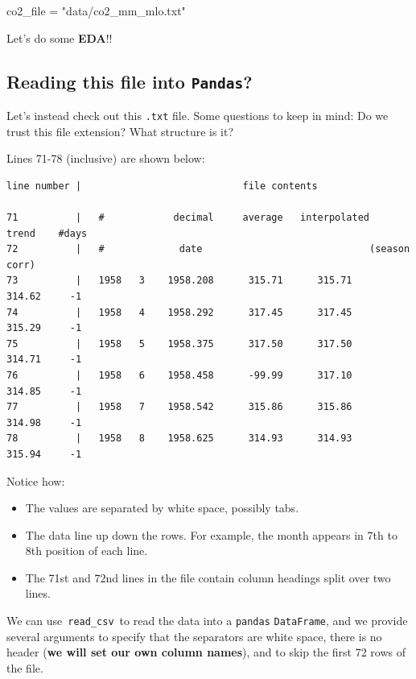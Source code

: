 \documentclass[
  letterpaper,
  DIV=11,
  numbers=noendperiod]{scrreprt}
\newenvironment{Shaded}{\begin{snugshade}}{\end{snugshade}}
\newcommand{\NormalTok}[1]{\textcolor[rgb]{0.00,0.23,0.31}{#1}}
\newcommand{\OperatorTok}[1]{\textcolor[rgb]{0.37,0.37,0.37}{#1}}
\newcommand{\StringTok}[1]{\textcolor[rgb]{0.13,0.47,0.30}{#1}}
\providecommand{\tightlist}{%
  \setlength{\itemsep}{0pt}\setlength{\parskip}{0pt}}\usepackage{longtable,booktabs,array}
\begin{document}
\begin{Shaded}
\begin{Highlighting}[]
\NormalTok{co2\_file }\OperatorTok{=} \StringTok{"data/co2\_mm\_mlo.txt"}
\end{Highlighting}
\end{Shaded}

Let's do some \textbf{EDA}!!

\hypertarget{reading-this-file-into-pandas}{%
\subsection{\texorpdfstring{Reading this file into
\texttt{Pandas}?}{Reading this file into Pandas?}}\label{reading-this-file-into-pandas}}

Let's instead check out this \texttt{.txt} file. Some questions to keep
in mind: Do we trust this file extension? What structure is it?

Lines 71-78 (inclusive) are shown below:

\begin{verbatim}
line number |                            file contents

71          |   #            decimal     average   interpolated    trend    #days
72          |   #             date                             (season corr)
73          |   1958   3    1958.208      315.71      315.71      314.62     -1
74          |   1958   4    1958.292      317.45      317.45      315.29     -1
75          |   1958   5    1958.375      317.50      317.50      314.71     -1
76          |   1958   6    1958.458      -99.99      317.10      314.85     -1
77          |   1958   7    1958.542      315.86      315.86      314.98     -1
78          |   1958   8    1958.625      314.93      314.93      315.94     -1
\end{verbatim}

Notice how:

\begin{itemize}
\tightlist
\item
  The values are separated by white space, possibly tabs.
\item
  The data line up down the rows. For example, the month appears in 7th
  to 8th position of each line.
\item
  The 71st and 72nd lines in the file contain column headings split over
  two lines.
\end{itemize}

We can use~\texttt{read\_csv}~to read the data into a \texttt{pandas}
\texttt{DataFrame}, and we provide several arguments to specify that the
separators are white space, there is no header (\textbf{we will set our
own column names}), and to skip the first 72 rows of the file.
\end{document}
